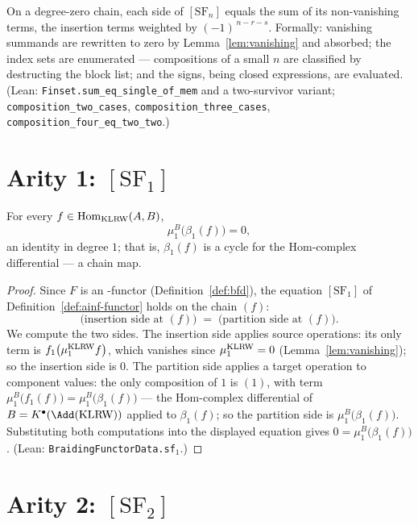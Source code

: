 \begin{lemma}\label{lem:sum-eval}
  On a degree-zero chain, each side of $[\mathrm{SF}_n]$ equals the sum of
  its non-vanishing terms, the insertion terms weighted by
  $(-1)^{\,n-r-s}$. Formally: vanishing summands are rewritten to zero by
  Lemma~\ref{lem:vanishing} and absorbed; the index sets are enumerated ---
  compositions of a small $n$ are classified by destructing the block list;
  and the signs, being closed expressions, are evaluated. (Lean:
  \texttt{Finset.sum\_eq\_single\_of\_mem} and a two-survivor variant;
  \texttt{composition\_two\_cases}, \texttt{composition\_three\_cases},
  \texttt{composition\_four\_eq\_two\_two}.)
\end{lemma}

\section{Arity 1: \texorpdfstring{$[\mathrm{SF}_1]$}{[SF1]}}

\begin{theorem}\label{thm:sf1}
  For every $f \in \operatorname{Hom}_{\operatorname{KLRW}}(A, B)$,
  \[
    \mu^B_1\big(\beta_1(f)\big) = 0 ,
  \]
  an identity in degree $1$; that is, $\beta_1(f)$ is a cycle for the
  Hom-complex differential --- a chain map.
\end{theorem}

\begin{proof}
  Since $F$ is an \Ainf-functor (Definition~\ref{def:bfd}), the equation
  $[\mathrm{SF}_1]$ of Definition~\ref{def:ainf-functor} holds on the chain
  $(f)$:
  \[
    \text{(insertion side at $(f)$)} \;=\; \text{(partition side at $(f)$)} .
  \]
  We compute the two sides. The insertion side applies source operations: its
  only term is $f_1\big(\mu^{\operatorname{KLRW}}_1 f\big)$, which vanishes since
  $\mu^{\operatorname{KLRW}}_1 = 0$ (Lemma~\ref{lem:vanishing}); so the insertion side is
  $0$. The partition side applies a target operation to component values: the
  only composition of $1$ is $(1)$, with term
  $\mu^{B}_1\big(f_1(f)\big) = \mu^{B}_1\big(\beta_1(f)\big)$ --- the
  Hom-complex differential of $B = K^\bullet(\Add(\KLRW))$ applied to
  $\beta_1(f)$; so the partition side is $\mu^{B}_1\big(\beta_1(f)\big)$.
  Substituting both computations into the displayed equation gives
  $0 = \mu^{B}_1\big(\beta_1(f)\big)$.
  (Lean: \texttt{BraidingFunctorData.sf}$_1$.)
\end{proof}

\section{Arity 2: \texorpdfstring{$[\mathrm{SF}_2]$}{[SF2]}}

